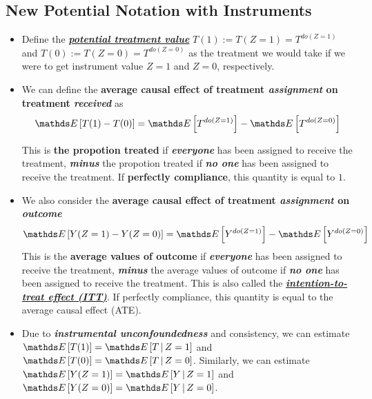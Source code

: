 \documentclass[11pt]{article}
\begin{document}
\subsection{New Potential Notation with Instruments}
\begin{itemize}
\item Define the \underline{\emph{\textbf{potential treatment value}}} $T(1) := T(Z=1) = T^{do(Z=1)}$ and $T(0) := T(Z=0) = T^{do(Z=0)}$ as the treatment we would take if we were to get instrument value $Z=1$ and $Z=0$, respectively.

\item We can define the \textbf{average causal effect of treatment \emph{assignment} on treatment \emph{received}} as
\begin{align}
\E{}{T(1) - T(0)} = \E{}{T^{do(Z=1)}} - \E{}{T^{do(Z=0)}} \label{eqn: causal_effect_treat_assign_to_treat_received}
\end{align}

This is \textbf{the propotion treated} if \emph{\textbf{everyone}} has been assigned to receive the treatment, \textbf{\emph{minus}} the propotion treated if \emph{\textbf{no one}} has been assigned to receive the treatment. If \textbf{perfectly compliance}, this quantity is equal to $1$.

\item We also consider the \textbf{average causal effect of treatment \emph{assignment} on \emph{\textbf{outcome}}}
\begin{align}
\E{}{Y(Z=1) - Y(Z=0)} = \E{}{Y^{do(Z=1)}} - \E{}{Y^{do(Z=0)}} \label{eqn: causal_effect_treat_assign_to_outcome}
\end{align} 
This is the \textbf{average values of outcome} if \emph{\textbf{everyone}} has been assigned to receive the treatment, \textbf{\emph{minus}} the average values of outcome if \emph{\textbf{no one}} has been assigned to receive the treatment. This is also called the \underline{\textbf{\emph{intention-to-treat effect (ITT)}}}. If perfectly compliance, this quantity is equal to the average causal effect (ATE).

\item Due to \emph{\textbf{instrumental unconfoundedness}} and consistency, we can estimate $\E{}{T(1)}= \E{}{T\,|\, Z=1}$ and $\E{}{T(0)}= \E{}{T\,|\, Z=0}$. 
Similarly, we can estimate $\E{}{Y(Z=1)} = \E{}{Y\,|\, Z=1}$ and $\E{}{Y(Z=0)} = \E{}{Y\,|\, Z=0}$.
\end{itemize}
\end{document}
